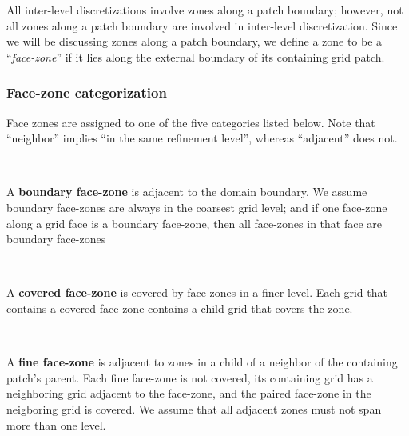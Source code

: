 \documentclass[10pt]{article}
\begin{document}
All inter-level discretizations involve zones along a patch boundary;
however, not all zones along a patch boundary are involved in
inter-level discretization.  Since we will be discussing zones along a
patch boundary, we define a zone to be a ``\textit{face-zone}'' if it
lies along the external boundary of its containing grid patch.


\subsubsection{Face-zone categorization}

Face zones are assigned to one of the five categories listed below.
Note that ``neighbor'' implies ``in the same refinement level'',
whereas ``adjacent'' does not.


\begin{minipage}{1in}
\end{minipage} \
\begin{minipage}{5.8in}
 A \textbf{boundary face-zone} is adjacent to the domain boundary.  We
assume boundary face-zones are always in the coarsest grid level; and
if one face-zone along a grid face is a boundary face-zone, then all
face-zones in that face are boundary face-zones
\end{minipage}

\begin{minipage}{1in}
\end{minipage} \
\begin{minipage}{5.8in}
A \textbf{covered face-zone} is covered by face zones in a finer
level.  Each grid that contains a covered face-zone contains a child
grid that covers the zone.
\end{minipage}

\begin{minipage}{1in}
\end{minipage} \
\begin{minipage}{5.8in}
A \textbf{fine face-zone} is adjacent to zones in a child of a
neighbor of the containing patch's parent.  Each fine face-zone is not
covered, its containing grid has a neighboring grid adjacent to the
face-zone, and the paired face-zone in the neigboring grid is covered.
We assume that all adjacent zones must not span more than one level.
\end{minipage}
\end{document}
